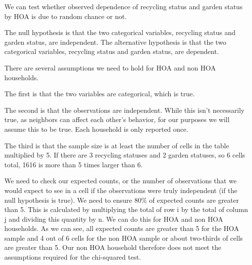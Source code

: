 \documentclass{article}
\begin{document}
We can test whether observed dependence of recycling status and garden status by HOA is due to random chance or not. 

The null hypothesis is that the two categorical variables, recycling status and garden status, are independent.
The alternative hypothesis is that the two categorical variables, recycling status and garden status, are dependent. 

There are several assumptions we need to hold for HOA and non HOA households. 

The first is that the two variables are categorical, which is true.

The second is that the observations are independent. While this isn't necessarily true, as neighbors can affect each other's behavior, for our purposes we will assume this to be true. Each household is only reported once. 

The third is that the sample size is at least the number of cells in the table multiplied by 5. If there are 3 recycling statuses and 2 garden statuses, so 6 cells total, 1616 is more than 5 times larger than 6. 

We need to check our expected counts, or the number of observations that we would expect to see in a cell if the observations were truly independent (if the null hypothesis is true). We need to ensure 80\% of expected counts are greater than 5. This is calculated by multiplying the total of row i by the total of column j and dividing this quantity by n. We can do this for HOA and non HOA households. 
\newline
\newline
{}
As we can see, all expected counts are greater than 5 for the HOA sample and 4 out of 6 cells for the non HOA sample or about two-thirds of cells are greater than 5. Our non HOA household therefore does not meet the assumptions required for the chi-squared test. 
\end{document}
